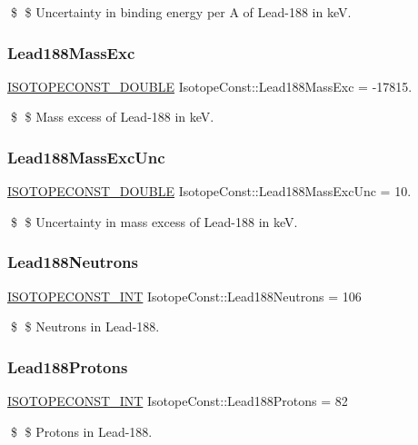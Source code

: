 \$ \$ Uncertainty in binding energy per A of Lead-\/188 in keV. \mbox{\label{group___isotope_const-_lead-_pb188_gad0d8f306ceae9d4c849d327a091eb935}} 
\subsubsection{\texorpdfstring{Lead188\+Mass\+Exc}{Lead188MassExc}}
{\footnotesize\ttfamily \mbox{\hyperlink{group___isotope_const-_macros_ga8f45a7272ce02c0b4c65c44636ed719a}{I\+S\+O\+T\+O\+P\+E\+C\+O\+N\+S\+T\+\_\+\+D\+O\+U\+B\+LE}} Isotope\+Const\+::\+Lead188\+Mass\+Exc = -\/17815.}

\$ \$ Mass excess of Lead-\/188 in keV. \mbox{\label{group___isotope_const-_lead-_pb188_ga6389d48384c039ffe88dba688d18f6af}} 
\subsubsection{\texorpdfstring{Lead188\+Mass\+Exc\+Unc}{Lead188MassExcUnc}}
{\footnotesize\ttfamily \mbox{\hyperlink{group___isotope_const-_macros_ga8f45a7272ce02c0b4c65c44636ed719a}{I\+S\+O\+T\+O\+P\+E\+C\+O\+N\+S\+T\+\_\+\+D\+O\+U\+B\+LE}} Isotope\+Const\+::\+Lead188\+Mass\+Exc\+Unc = 10.}

\$ \$ Uncertainty in mass excess of Lead-\/188 in keV. \mbox{\label{group___isotope_const-_lead-_pb188_gac8e494fa1e14b751e539c2e1c9d168f4}} 
\subsubsection{\texorpdfstring{Lead188\+Neutrons}{Lead188Neutrons}}
{\footnotesize\ttfamily \mbox{\hyperlink{group___isotope_const-_macros_ga5f18360b3e99483a35c32d789e62621c}{I\+S\+O\+T\+O\+P\+E\+C\+O\+N\+S\+T\+\_\+\+I\+NT}} Isotope\+Const\+::\+Lead188\+Neutrons = 106}

\$ \$ Neutrons in Lead-\/188. \mbox{\label{group___isotope_const-_lead-_pb188_gaf8585b1232ee8e63455d3f2e194e5493}} 
\subsubsection{\texorpdfstring{Lead188\+Protons}{Lead188Protons}}
{\footnotesize\ttfamily \mbox{\hyperlink{group___isotope_const-_macros_ga5f18360b3e99483a35c32d789e62621c}{I\+S\+O\+T\+O\+P\+E\+C\+O\+N\+S\+T\+\_\+\+I\+NT}} Isotope\+Const\+::\+Lead188\+Protons = 82}

\$ \$ Protons in Lead-\/188. 
